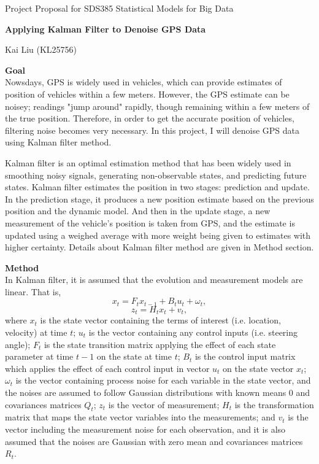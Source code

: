 \documentclass[11pt]{article}
\begin{document}
\thispagestyle{empty}

\begin{center}
{\large Project Proposal for SDS385 Statistical Models for Big Data}

{\LARGE \bf Applying Kalman Filter to Denoise GPS Data}

Kai Liu (KL25756)
\end{center}

\textbf{Goal}\\
Nowsdays, GPS is widely used in vehicles, which can provide estimates of position of vehicles within a few meters. However, the GPS estimate can be noisey; readings "jump around" rapidly, though remaining within a few meters of the true position. Therefore, in order to get the accurate position of vehicles, filtering noise becomes very necessary. In this project, I will denoise GPS data using Kalman filter method.

Kalman filter is an optimal estimation method that has been widely used in smoothing noisy signals, generating non-observable states, and predicting future states. Kalman filter estimates the position in two stages: prediction and update. In the prediction stage, it produces a new position estimate based on the previous position and the dynamic model. And then in the update stage, a new measurement of the vehicle's position is taken from GPS, and the estimate is updated using a weighed average with more weight being given to estimates with higher certainty. Details about Kalman filter method are given in Method section.

\textbf{Method}\\
In Kalman filter, it is assumed that the evolution and measurement models are linear. That is,
$$x_t = F_t x_{t-1} + B_t u_t + \omega_t,$$
$$z_t = H_t x_t + v_t,$$
where $x_t$ is the state vector containing the terms of interest (i.e. location, velocity) at time $t$; $u_t$ is the vector containing any control inputs (i.e. steering angle); $F_t$ is the state transition matrix applying the effect of each state parameter at time $t-1$ on the state at time $t$; $B_t$ is the control input matrix which applies the effect of each control input in vector $u_t$ on the state vector $x_t$; $\omega_t$ is the vector containing process noise for each variable in the state vector, and the noises are assumed to follow Gaussian distributions with known means 0 and covariances matrices $Q_t$; $z_t$ is the vector of measurement; $H_t$ is the transformation matrix that maps the state vector variables into the measurements; and $v_t$ is the vector including the measurement noise for each observation, and it is also assumed that the noises are Gaussian with zero mean and covariances matrices $R_t$. 
\end{document}
